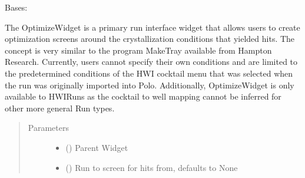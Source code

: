 \documentclass[letterpaper,10pt,english]{sphinxmanual}
\begin{document}
\begin{fulllineitems}
\label{\detokenize{polo.widgets:polo.widgets.optimize_widget.OptimizeWidget}}
Bases: 

\begin{fulllineitems}
\label{\detokenize{polo.widgets:polo.widgets.optimize_widget.OptimizeWidget.GRID_ICON}}
The OptimizeWidget is a primary run interface widget that allows
users to create optimization screens around the crystallization conditions
that yielded hits. The concept is very similar to the program MakeTray
available from Hampton Research. Currently, users cannot specify their
own conditions and are limited to the predetermined conditions of the
HWI cocktail menu that was selected when the run was originally imported
into Polo. Additionally, OptimizeWidget is only available to HWIRuns
as the cocktail to well mapping cannot be inferred for other more
general Run types.
\begin{quote}\begin{description}
\item[{Parameters}] \leavevmode\begin{itemize}
\item {} 
 () \textendash{} Parent Widget

\item {} 
 ({\hyperref[\detokenize{polo.crystallography:polo.crystallography.run.HWIRun}]{}}\sphinxstyleliteralemphasis{\sphinxupquote{, }}) \textendash{} Run to screen for hits from, defaults to None

\end{itemize}


\end{description}
\end{quote}
\end{fulllineitems}
\end{fulllineitems}
\end{document}
